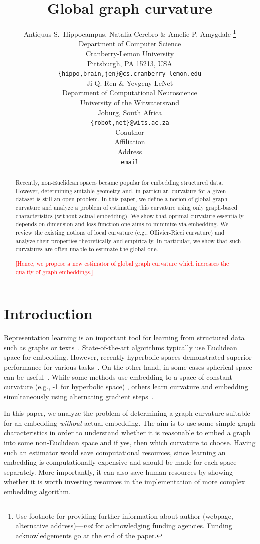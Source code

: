 \documentclass{article} %
\title{Global graph curvature}
\author{Antiquus S.~Hippocampus, Natalia Cerebro \& Amelie P. Amygdale \thanks{ Use footnote for providing further information
about author (webpage, alternative address)---\emph{not} for acknowledging
funding agencies.  Funding acknowledgements go at the end of the paper.} \\
Department of Computer Science\\
Cranberry-Lemon University\\
Pittsburgh, PA 15213, USA \\
\texttt{\{hippo,brain,jen\}@cs.cranberry-lemon.edu} \\
\And
Ji Q. Ren \& Yevgeny LeNet \\
Department of Computational Neuroscience \\
University of the Witwatersrand \\
Joburg, South Africa \\
\texttt{\{robot,net\}@wits.ac.za} \\
\AND
Coauthor \\
Affiliation \\
Address \\
\texttt{email}
}
\begin{document}
\maketitle

\begin{abstract}
Recently, non-Euclidean spaces became popular for embedding structured data. However, determining suitable geometry and, in particular, curvature for a given dataset is still an open problem. 
In this paper, we define a notion of global graph curvature and analyze a problem of estimating this curvature using only graph-based characteristics (without actual embedding). 
We show that optimal curvature essentially depends on dimension and loss function one aims to minimize via embedding.
We review the existing notions of local curvature (e.g., Ollivier-Ricci curvature) and analyze their properties theoretically and empirically. 
In particular, we show that such curvatures are often unable to estimate the global one. 

\textcolor{red}{[Hence, we propose a new estimator of global graph curvature which increases the quality of graph embeddings.]}
\end{abstract}

\section{Introduction}

Representation learning is an important tool for learning from structured data such as graphs or texts~\citep{grover2016node2vec,perozzi2014deepwalk,mikolov2013distributed}.
State-of-the-art algorithms typically use Euclidean space for embedding. 
However, recently hyperbolic spaces demonstrated superior performance for various tasks~\citep{nickel2018learning,sala2018representation}. On the other hand, in some cases spherical space can be useful~\citep{liu2017sphereface}.
While some methods use embedding to a space of constant curvature (e.g., -1 for hyperbolic space) \citep{nickel2018learning}, others learn curvature and embedding simultaneously using alternating gradient steps~\cite{gu2019learning}.

In this paper, we analyze the problem of determining a graph curvature suitable for an embedding \textit{without} actual embedding. The aim is to use some simple graph characteristics in order to understand whether it is reasonable to embed a graph into some non-Euclidean space and if yes, then which curvature to choose. 
Having such an estimator would save computational resources, since learning an embedding is computationally expensive and should be made for each space separately. 
More importantly, it can also save human resources by showing whether it is worth investing resources in the implementation of more complex embedding algorithm.
\end{document}
